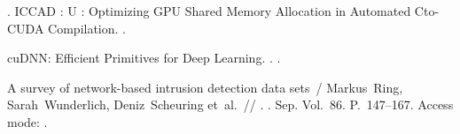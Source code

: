 \begin{thebibliography}{10}
  . ICCAD : U : Optimizing GPU Shared
    Memory Allocation in Automated Cto-CUDA Compilation. \BibDash
  .
  
   cuDNN:
    Efficient Primitives for Deep Learning. \BibDash
  . \BibDash
  .
  
  A survey of network-based intrusion detection data sets~/ Markus~Ring,
    Sarah~Wunderlich, Deniz~Scheuring et~al.~//
    \href{http://dx.doi.org/10.1016/j.cose.2019.06.005}{}. \BibDash
  . \BibDash Sep. \BibDash
  \newblock Vol.~86. \BibDash
  \newblock P.~147–167. \BibDash
  \newblock Access mode: .
  
  \end{thebibliography}